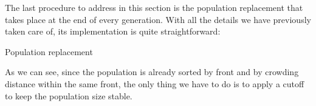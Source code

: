 	The last procedure to address in this section is the population replacement that takes place at the end of every generation. With all the details we have previously taken care of, its implementation is quite straightforward:

	\vspace{0.3cm}

	\begin{algorithm}[H]


		\caption{Population replacement}

	\end{algorithm}

	\vspace{0.3cm}

	As we can see, since the population is already sorted by front and by crowding distance within the same front, the only thing we have to do is to apply a cutoff to keep the population size stable.